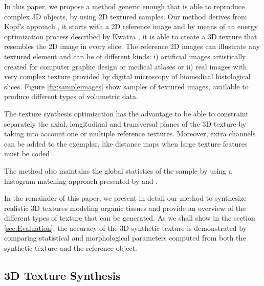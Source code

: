 In this paper, we propose a method generic enough that is able to reproduce complex 3D objects, 
by using 2D textured samples.
Our method derives from Kopf's approach \cite{KFCODLW07}, it starts with a 2D reference image and 
by means of an energy optimization process described by Kwatra \cite{kwatra:2005:SIGGRAPH}, 
it is able to create a 3D texture that resembles the 2D image in every slice.
The reference 2D images can illustrate any textured element and can be of different kinds: i) artificial images artistically created for computer graphic design or medical atlases 
or ii) real images with very complex texture provided by digital microscopy of biomedical histological slices. 
Figure \ref{fig:sampleimages} show samples of textured images, available to produce different types of volumetric data.

The texture synthesis optimization has the advantage to be able to constraint separately the axial, longitudinal and transversal planes of the 3D texture 
by taking into account one or multiple reference textures. 
Moreover, extra channels can be added to the exemplar, like distance maps when large texture features must be coded  \cite{Lefebvre:2006:ATS:1141911.1141921}. 

The method also maintains the global statistics of the sample by using a histogram matching 
approach presented by \cite{ROLLAND2000} and \cite{Heeger:1995:PTA:218380.218446}.
 
%
In the remainder of this paper, we present in detail our method to synthesize realistic 3D textures modeling organic tissues and  
provide an overview of the different types of texture that can be generated. As we shall show in the section  \ref{sec:Evaluation}, 
the accuracy of the 3D synthetic texture is demonstrated by comparing statistical and morphological parameters computed from both the synthetic texture and the reference object. %

\subsection{3D Texture Synthesis}
\label{sec:TextureSynthesis}

